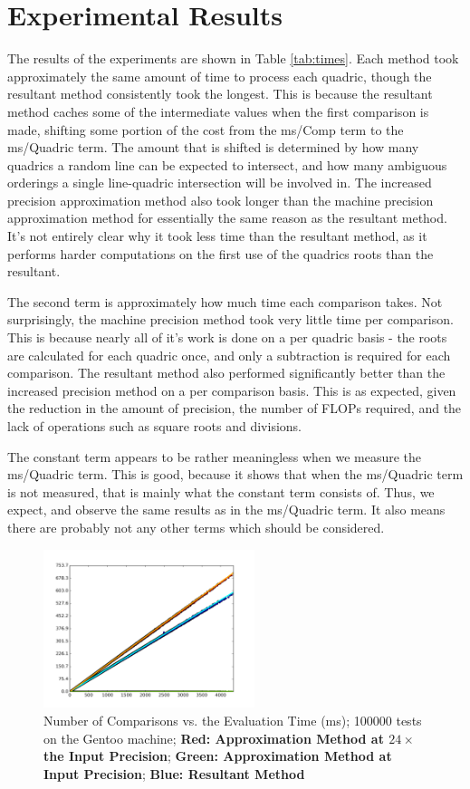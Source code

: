 \documentclass{cccg16}
\begin{document}
\section{Experimental Results}
The results of the experiments are shown in Table \ref{tab:times}.
Each method took approximately the same amount of time to process each
quadric, though the resultant method consistently took the longest.
This is because the resultant method caches some of the intermediate
values when the first comparison is made, shifting some portion of the
cost from the ms/Comp term to the ms/Quadric term.  The
amount that is shifted is determined by how many quadrics a random
line can be expected to intersect, and how many ambiguous orderings a
single line-quadric intersection will be involved in.  The increased
precision approximation method also took longer than the machine
precision approximation method for essentially the same reason as the
resultant method.  It's not entirely clear why it took less time than
the resultant method, as it performs harder computations on the first
use of the quadrics roots than the resultant.

The second term is approximately how much time each comparison takes.
Not surprisingly, the machine precision method took very little time
per comparison.  This is because nearly all of it's work is done on a
per quadric basis - the roots are calculated for each quadric once,
and only a subtraction is required for each comparison. The resultant
method also performed significantly better than the increased
precision method on a per comparison basis.  This is as expected,
given the reduction in the amount of precision, the number of FLOPs
required, and the lack of operations such as square roots and
divisions.

The constant term appears to be rather meaningless when we measure the
ms/Quadric term.  This is good, because it shows that when the
ms/Quadric term is not measured, that is mainly what the constant term
consists of.  Thus, we expect, and observe the same results as in the
ms/Quadric term.  It also means there are probably not any other terms
which should be considered.

\begin{figure}
  \includegraphics[width=0.55\textwidth]{imgs/hardEllipsoidsSingle_gentoo_adjusted.png}
  \caption{Number of Comparisons vs. the Evaluation Time (ms); 100000
    tests on the Gentoo machine; {\bf Red: Approximation Method at
      $24\times$ the Input Precision}; {\bf Green: Approximation
      Method at Input Precision}; {\bf Blue: Resultant Method}}
  \label{fig:linefit}
\end{figure}
\end{document}
